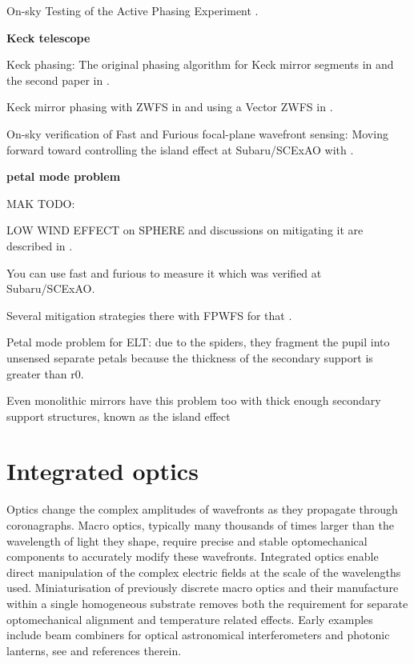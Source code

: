 \documentclass[letterpaper]{ar-1col}
\begin{document}
On-sky Testing of the Active Phasing Experiment  \citet{Gonte09}.

{\bf Keck telescope}

Keck phasing: The original phasing algorithm for Keck mirror segments in \citet{Chanan98} and the second paper in \citet{Chanan00}.

Keck mirror phasing with ZWFS in \citet{vanKooten22} and using a Vector ZWFS in \citet{Salama24}.

On-sky verification of Fast and Furious focal-plane wavefront sensing: Moving forward toward controlling the island effect at Subaru/SCExAO with \citet{Bos20}.

{\bf petal mode problem}

MAK TODO:

LOW WIND EFFECT on SPHERE \citep{Sauvage16} and discussions on mitigating it are described in \citet{Milli18}.

You can use fast and furious to measure it \citep{Wilby18} which was verified at Subaru/SCExAO.

Several mitigation strategies there with FPWFS for that \citep{Vievard19}.

Petal mode problem for ELT: due to the spiders, they fragment the pupil into unsensed separate petals because the thickness of the secondary support is greater than r0.

Even monolithic mirrors have this problem too with thick enough secondary support structures, known as the island effect \citep{Leboulleux22,Leboulleux22a}

\section{Integrated optics}

Optics change the complex amplitudes of wavefronts as they propagate through coronagraphs.
%
Macro optics, typically many thousands of times larger than the wavelength of light they shape, require precise and stable optomechanical components to accurately modify these wavefronts.
%
Integrated optics enable direct manipulation of the complex electric fields at the scale of the wavelengths used.
%
Miniaturisation of previously discrete macro optics and their manufacture within a single homogeneous substrate removes both the requirement for separate optomechanical alignment and temperature related effects.
%
Early examples include beam combiners for optical astronomical interferometers \citep[for example the IOTA/IONIC beam combiner ][]{Berger01} and photonic lanterns, see \citet{Leon-Saval10} and references therein.
\end{document}
